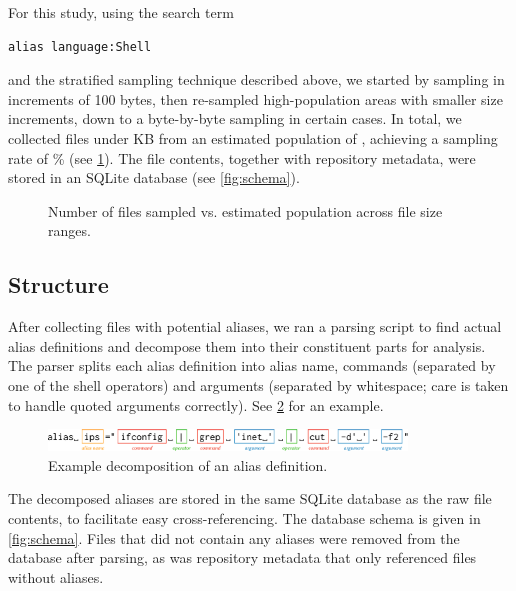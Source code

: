 For this study, using the search term
\begin{verbatim}
alias language:Shell
\end{verbatim}
and the stratified sampling technique described above, we started by sampling in increments of 100 bytes, then re-sampled high-population areas with smaller size increments, down to a byte-by-byte sampling in certain cases.
In total, we collected \TODO files under \TODO KB from an estimated population of \TODO, achieving a sampling rate of \TODO\% (see \cref{fig:sampling}).
The file contents, together with repository metadata, were stored in an SQLite database (see \cref{fig:schema}).

\begin{figure}
    \centering
    \TODO
    \caption{Number of files sampled vs. estimated population across file size ranges.}
    \label{fig:sampling}
\end{figure}


\subsection{Structure}

After collecting files with potential aliases, we ran a parsing script to find actual alias definitions and decompose them into their constituent parts for analysis.
The parser splits each alias definition into alias name, commands (separated by one of the shell operators) and arguments (separated by whitespace; care is taken to handle quoted arguments correctly).
See \cref{fig:parser} for an example.

\begin{figure}
    \centering
    \includegraphics[width=0.85\textwidth]{parser_breakdown.pdf}
    \caption{Example decomposition of an alias definition.}
    \label{fig:parser}
\end{figure}

The decomposed aliases are stored in the same SQLite database as the raw file contents, to facilitate easy cross-referencing.
The database schema is given in \cref{fig:schema}.
Files that did not contain any aliases were removed from the database after parsing, as was repository metadata that only referenced files without aliases.

